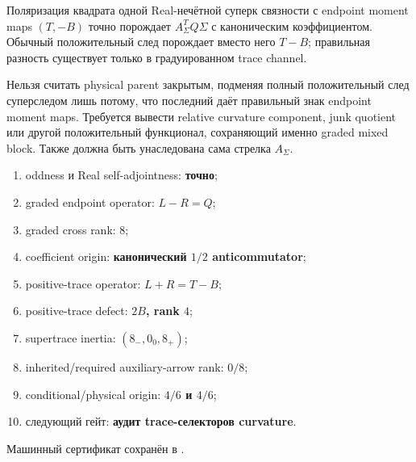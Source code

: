 \begin{theorem}
Поляризация квадрата одной Real-нечётной суперк связности с endpoint moment
maps $(T,-B)$ точно порождает $A_\Sigma^TQ\Sigma$ с каноническим
коэффициентом. Обычный положительный след порождает вместо него $T-B$;
правильная разность существует только в градуированном trace channel.
\end{theorem}

\begin{nogocriterion}
Нельзя считать physical parent закрытым, подменяя полный положительный
след суперследом лишь потому, что последний даёт правильный знак endpoint
moment maps. Требуется вывести relative curvature component, junk quotient
или другой положительный функционал, сохраняющий именно graded mixed block.
Также должна быть унаследована сама стрелка $A_\Sigma$.
\end{nogocriterion}

\begin{protocol}\begin{enumerate}
\item oddness и Real self-adjointness: \textbf{точно};
\item graded endpoint operator: \textbf{$L-R=Q$};
\item graded cross rank: \textbf{$8$};
\item coefficient origin: \textbf{канонический $1/2$ anticommutator};
\item positive-trace operator: \textbf{$L+R=T-B$};
\item positive-trace defect: \textbf{$2B$, rank $4$};
\item supertrace inertia: \textbf{$(8_-,0_0,8_+)$};
\item inherited/required auxiliary-arrow rank: \textbf{$0/8$};
\item conditional/physical origin: \textbf{$4/6$ и $4/6$};
\item следующий гейт: \textbf{аудит trace-селекторов curvature}.
\end{enumerate}\end{protocol}

Машинный сертификат сохранён в
.